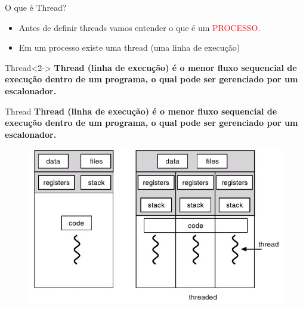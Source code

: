 \documentclass[10pt, xcolor=x11names]{beamer}
\begin{document}
\begin{frame} %
	\begin{block}{O que é Thread?}
		\begin{itemize}
			\item Antes de definir threads vamos entender o que é um \textcolor{red}{PROCESSO}.

			\item Em um processo existe uma thread (uma linha de execução)
		\end{itemize}
	\end{block}

	\begin{alertblock}{Thread}<2->
		\textbf{Thread (linha de execução) é o menor fluxo sequencial de execução dentro de um programa, o qual pode ser gerenciado por um escalonador.}
	\end{alertblock}
	
\end{frame}

\begin{frame}
	\begin{alertblock}{Thread}
		\textbf{Thread (linha de execução) é o menor fluxo sequencial de execução dentro de um programa, o qual pode ser gerenciado por um escalonador.}
	\end{alertblock}

	\begin{figure}
	\centering
		\includegraphics[width=1\linewidth]{img/Thread-1}
	\end{figure}

\end{frame}

\end{document}

